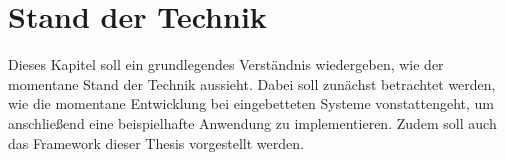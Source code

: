 \chapter{Stand der Technik}
\label{chap:standTechnik}
Dieses Kapitel soll ein grundlegendes Verständnis wiedergeben, wie der momentane Stand der
Technik aussieht. Dabei soll zunächst betrachtet werden, wie die
momentane Entwicklung bei eingebetteten Systeme vonstattengeht, um anschließend eine
beispielhafte Anwendung zu implementieren. Zudem soll auch das Framework dieser Thesis
vorgestellt werden.


